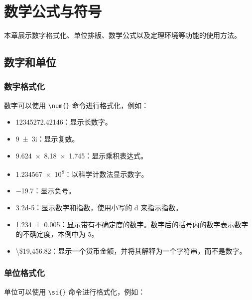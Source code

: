 \chapter{数学公式与符号}\label{sec:math}

本章展示数字格式化、单位排版、数学公式以及定理环境等功能的使用方法。

\section{数字和单位}

\subsection*{数字格式化}

数字可以使用 \verb|\num{}| 命令进行格式化，例如：

\begin{itemize}
  \item \num{12345272.42146}：显示长数字。
  \item \num{9+-3i}：显示复数。
  \item \num{9.624 x 8.18 x 1.745}：显示乘积表达式。
  \item \num{1.234567e8}：以科学计数法显示数字。
  \item \num{-19.7}：显示负号。
  \item \num{3.2d-5}：显示数字和指数，使用小写的 d 来指示指数。
  \item \num{1.234(5)}：显示带有不确定度的数字。数字后的括号内的数字表示数字的不确定度，本例中为 5。
  \item \num[parse-numbers=false]{\$19,456.82}：显示一个货币金额，并将其解释为一个字符串，而不是数字。
\end{itemize}

\subsection*{单位格式化}

单位可以使用 \verb|\si{}| 命令进行格式化，例如：

